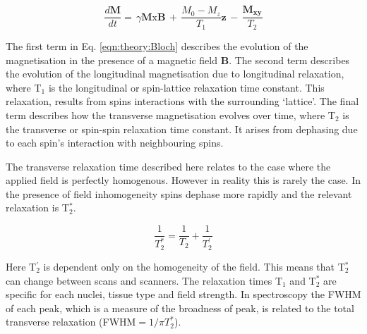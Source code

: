 \begin{equation}
    \frac{d\mathbf{M}}{dt} = \, \gamma\mathbf{M}\textrm{x}\mathbf{B} \, + \, \frac{M_0-M_z}{T_1}\mathbf{z} \, - \, \frac{\mathbf{M_{xy}}}{T_2}
    \label{eqn:theory:Bloch}
\end{equation}

The first term in Eq. \ref{eqn:theory:Bloch} describes the evolution of the magnetisation in the presence of a magnetic field $\mathbf{B}$. The second term describes the evolution of the longitudinal magnetisation due to longitudinal relaxation, where T$_1$ is the longitudinal or spin-lattice relaxation time constant. This relaxation, results from spins interactions with the surrounding `lattice'. The final term describes how the transverse magnetisation evolves over time, where T$_2$ is the transverse or spin-spin relaxation time constant. It arises from dephasing due to each spin's interaction with neighbouring spins. 

The transverse relaxation time described here relates to the case where the applied field is perfectly homogenous. However in reality this is rarely the case. In the presence of field inhomogeneity spins dephase more rapidly and the relevant relaxation is T$_2^*$.

\begin{equation}
    \frac{1}{T_2^*} = \frac{1}{T_2} + \frac{1}{T_2^{'}}
    \label{eqn:theory:trans}
\end{equation}

Here T$_2^{'}$ is dependent only on the homogeneity of the field. This means that T$_2^*$ can change between scans and scanners. The relaxation times T$_1$ and T$_2^*$ are specific for each nuclei, tissue type and field strength. In spectroscopy the \ac{FWHM} of each peak, which is a measure of the broadness of peak, is related to the total transverse relaxation (\ac{FWHM}$ = 1 / \pi T_2^*$). 


